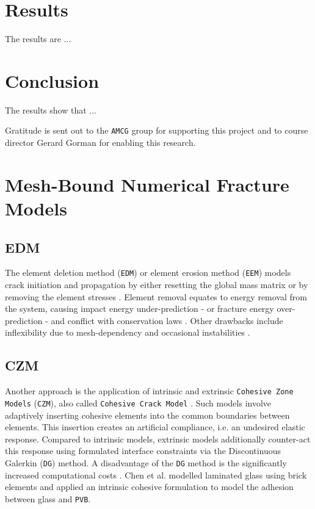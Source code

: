 \documentclass[format=acmtog, 12pt, screen=true, review=false]{acmart}
\begin{document}
\section{Results}

The results are ...

\section{Conclusion}

The results show that ...

\begin{acks}
Gratitude is sent out to the \texttt{AMCG} group for supporting this project and to course director Gerard Gorman for enabling this research.
\end{acks}


\setlength{\bibsep}{5.0pt}


\appendix

\section{Mesh-Bound Numerical Fracture Models}

\subsection{EDM}
The element deletion method (\texttt{EDM}) or element erosion method (\texttt{EEM}) models crack initiation and propagation by either resetting the global mass matrix or by removing the element stresses \cite{Wan18, Liu16, Pel16}. Element removal equates to energy removal from the system, causing impact energy under-prediction \cite{Alt17, Ved17} - or fracture energy over-prediction \cite{Pel16} - and conflict with conservation laws \cite{Pel16}. Other drawbacks include inflexibility due to mesh-dependency and occasional instabilities \cite{Pel16}.

\subsection{CZM}

Another approach is the application of intrinsic and extrinsic \texttt{Cohesive Zone Models} (\texttt{CZM}), also called \texttt{Cohesive Crack Model} \cite{Gao14}. Such models involve adaptively inserting cohesive elements into the common boundaries between elements. This insertion creates an artificial compliance, i.e. an undesired elastic response. Compared to intrinsic models, extrinsic models additionally counter-act this response using formulated interface constraints via the Discontinuous Galerkin (\texttt{DG}) method. A disadvantage of the \texttt{DG} method is the significantly increased computational costs \cite{Wan18, Liu16, Che16}. Chen et al. \cite{Che16} modelled laminated glass using brick elements and applied an intrinsic cohesive formulation to model the adhesion between glass and \texttt{PVB}. 
\end{document}
